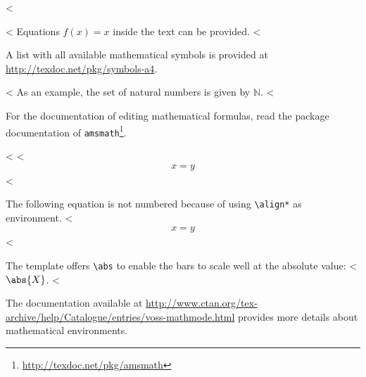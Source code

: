 <%

<%
Equations $f(x)=x$ inside the text can be provided.
<%

A list with all available mathematical symbols is provided at \url{http://texdoc.net/pkg/symbols-a4}.

<%
As an example, the set of natural numbers is given by $\mathbb{N}$.
<%

For the documentation of editing mathematical formulas, read the package documentation of \texttt{amsmath}\footnote{\url{http://texdoc.net/pkg/amsmath}}.

<%
<%
\begin{align}
  \label{eq:test}
  x = y
\end{align}
<%

The following equation is not numbered because of using \texttt{\textbackslash align*} as environment.
<%
\begin{align*}
  x = y
\end{align*}
<%

The template offers \verb+\abs+ to enable the bars to scale well at the absolute value:
<%
$\abs{X}$.
<%

The documentation available at \url{http://www.ctan.org/tex-archive/help/Catalogue/entries/voss-mathmode.html} provides more details about mathematical environments.
